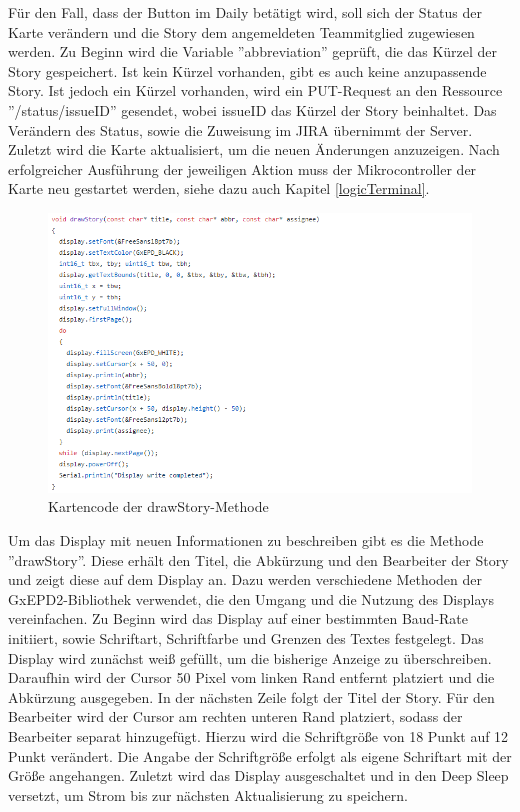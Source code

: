 \documentclass[12pt,titlepage]{scrartcl}
\begin{document}
			\noindent Für den Fall, dass der Button im Daily betätigt wird, soll sich der Status der Karte verändern und die Story dem angemeldeten Teammitglied zugewiesen werden. Zu Beginn wird die Variable ''abbreviation'' geprüft, die das Kürzel der Story gespeichert. Ist kein Kürzel vorhanden, gibt es auch keine anzupassende Story. Ist jedoch ein Kürzel vorhanden, wird ein PUT-Request an den Ressource ''/status/issueID'' gesendet, wobei issueID das Kürzel der Story beinhaltet. Das Verändern des Status, sowie die Zuweisung im JIRA übernimmt der Server. Zuletzt wird die Karte aktualisiert, um die neuen Änderungen anzuzeigen. Nach erfolgreicher Ausführung der jeweiligen Aktion muss der Mikrocontroller der Karte neu gestartet werden, siehe dazu auch Kapitel \ref{logicTerminal}. \\
			 \begin{figure}[H] 
  				\centering
    			\includegraphics[height=0.5\textheight]{storyHelper}
  				\caption{Kartencode der drawStory-Methode}
  				\label{fig:storyHelper}
			\end{figure}
			\noindent Um das Display mit neuen Informationen zu beschreiben gibt es die Methode ''drawStory''. Diese erhält den Titel, die Abkürzung und den Bearbeiter der Story und zeigt diese auf dem Display an. Dazu werden verschiedene Methoden der GxEPD2-Bibliothek verwendet, die den Umgang und die Nutzung des Displays vereinfachen. Zu Beginn wird das Display auf einer bestimmten Baud-Rate initiiert, sowie Schriftart, Schriftfarbe und Grenzen des Textes festgelegt. Das Display wird zunächst weiß gefüllt, um die bisherige Anzeige zu überschreiben. Daraufhin wird der Cursor 50 Pixel vom linken Rand entfernt platziert und die Abkürzung ausgegeben. In der nächsten Zeile folgt der Titel der Story. Für den Bearbeiter wird der Cursor am rechten unteren Rand platziert, sodass der Bearbeiter separat hinzugefügt. Hierzu wird die Schriftgröße von 18 Punkt auf 12 Punkt verändert. Die Angabe der Schriftgröße erfolgt als eigene Schriftart mit der Größe angehangen. Zuletzt wird das Display ausgeschaltet und in den Deep Sleep versetzt, um Strom bis zur nächsten Aktualisierung zu speichern.
\end{document}
